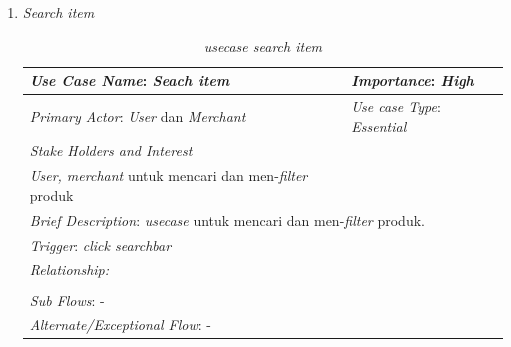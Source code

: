 \documentclass[a4paper]{article}
\begin{document}
\begin{enumerate}
\begin{enumerate}
        \newpage
        \item \textit{Search item}
            \begin{table}[h]
            \centering
            \caption{\textit{usecase search item} }
            \begin{tabular}{|lll}
            \hline
            \multicolumn{1}{|l|}{\textit{Use Case Name}: \textit{Seach item}}             & \multicolumn{2}{l|}{\textit{Importance}: \textit{High}}   \\ \hline
            \multicolumn{1}{|l|}{\textit{Primary Actor}: \textit{User} dan \textit{Merchant}}             & \multicolumn{2}{l|}{\textit{Use case Type}: \textit{Essential}} \\ \hline
            \multicolumn{1}{|l|}{\textit{Stake Holders and Interest}} &                               &                               \\ \cline{1-1}
            \multicolumn{1}{|l|}{\textit{User, merchant} untuk mencari dan men-\textit{filter} produk}                                                     &                               &                               \\ \hline
            \multicolumn{3}{|l|}{\textit{Brief Description}: \textit{usecase} untuk mencari dan men-\textit{filter} produk.}                                                                         \\ \hline
            \multicolumn{3}{|l|}{\textit{Trigger}: \textit{click searchbar}}                                                                                   \\ \hline
            \multicolumn{3}{|l|}{\textit{Relationship:}}                                                                              \\ \hline
            \multicolumn{3}{|l|}{}                                                                                                                     \\ \hline
            \multicolumn{3}{|l|}{\textit{Sub Flows}: -}                                                                                 \\ \hline
            \multicolumn{3}{|l|}{\textit{Alternate/Exceptional Flow}: -}                                                                \\ \hline
            \end{tabular}
            \end{table}


\end{enumerate}
\end{enumerate}
\end{document}
